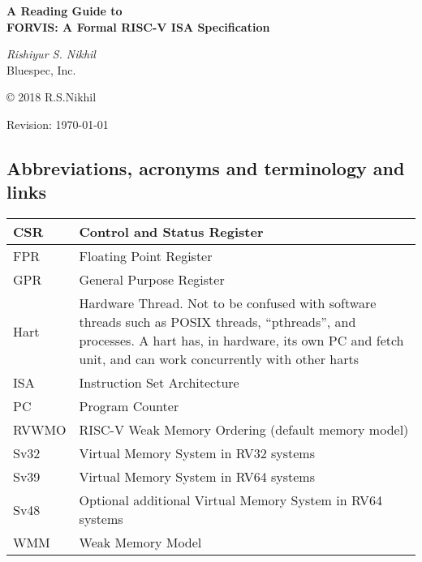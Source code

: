 \documentclass[11pt]{article}
\begin{document}

\pagestyle{empty}

\begin{center}

\vspace*{1.5in}

{\LARGE\bf A Reading Guide to} \\
{\LARGE\bf FORVIS: A Formal RISC-V ISA Specification}

\vspace{2cm}

{\Large \emph{Rishiyur S. Nikhil}} \\

Bluespec, Inc.


\vspace{0.5in}

\copyright{} 2018 R.S.Nikhil

\vspace{1in}

Revision: \today

\end{center}


\newpage



\subsection*{Abbreviations, acronyms and terminology and links}

\begin{tabular}{|l|p{4.5in}|}
\hline
CSR   & Control and Status Register \\
\hline
FPR   & Floating Point Register \\
\hline
GPR   & General Purpose Register \\
\hline
Hart  & Hardware Thread.  Not to be confused with software threads
         such as POSIX threads, ``pthreads'', and processes.
	 A hart has, in hardware, its own PC and fetch unit,
	 and can work concurrently with other harts \\
\hline
ISA   & Instruction Set Architecture \\
\hline
PC    & Program Counter \\
\hline
RVWMO & RISC-V Weak Memory Ordering (default memory model) \\
\hline
Sv32  & Virtual Memory System in RV32 systems \\
\hline
Sv39  & Virtual Memory System in RV64 systems \\
\hline
Sv48  & Optional additional Virtual Memory System in RV64 systems \\
\hline
WMM  & Weak Memory Model \\
\hline
\end{tabular}
\end{document}
